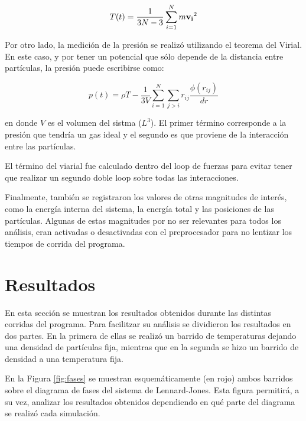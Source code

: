 \documentclass[a4paper,12pt]{article}
\begin{document}
\begin{equation}\label{eq:tempe}
 T(t) = \frac{1}{3N-3} \sum_{i=1}^{N} m {\bf v_i}^2
\end{equation}

Por otro lado, la medición de la presión se realizó utilizando el teorema del 
Virial. En este caso, y por tener un potencial que sólo depende de la distancia 
entre partículas, la presión puede escribirse como:

\begin{equation}\label{eq:pres}
p(t) = \rho T  - \frac{1}{3V} \sum_{i=1}^N \sum_{j>i} r_{ij} \frac{\phi(r_{ij})}{dr}
\end{equation}

\noindent en donde $V$ es el volumen del sistma ($L^3$). El primer término 
corresponde a la presión que tendría un gas ideal y el segundo es que proviene 
de la interacción entre las partículas.

El término del viarial fue calculado dentro del loop de fuerzas para evitar 
tener que realizar un segundo doble loop sobre todas las interacciones.

Finalmente, también se registraron los valores de otras magnitudes de interés, 
como la energía interna del sistema, la energía total y las posiciones de las 
partículas. Algunas de estas magnitudes por no ser relevantes para todos los 
análisis, eran activadas o desactivadas con el preprocesador para no lentizar 
los tiempos de corrida del programa.



\section{Resultados}

En esta sección se muestran los resultados obtenidos durante las distintas 
corridas del programa. Para facilitzar su análisis se dividieron los resultados 
en dos partes. En la primera de ellas se realizó un barrido de temperaturas 
dejando una densidad de partículas fija, mientras que en la segunda se hizo un 
barrido de densidad a una temperatura fija.

En la Figura \eqref{fig:fases} se muestran esquemáticamente (en rojo) ambos 
barridos sobre el diagrama de fases del sistema de Lennard-Jones. Esta figura 
permitirá, a su vez, analizar los resultados obtenidos dependiendo en qué parte 
del diagrama se realizó cada simulación.
\end{document}
